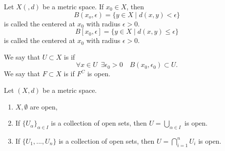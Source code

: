 \documentclass[notoc,notitlepage]{tufte-book}
\begin{document}
\begin{defn}
\label{defn:open_n_closed}
  Let $X(, d)$ be a metric space. If $x_0 \in X$, then
  \begin{equation*}
    B(x_o, \epsilon) = \{ y \in X \mid d(x, y) < \epsilon \}
  \end{equation*}
  is called the  centered at $x_0$ with radius $\epsilon > 0$.
  \begin{equation*}
    B[x_0, \epsilon] = \{ y \in X \mid d(x, y) \leq \epsilon \}
  \end{equation*}
  is called the  centered at $x_0$ with radius $\epsilon > 0$.

  We say that $U \subset X$ is  if
  \begin{equation*}
    \forall x \in U \enspace \exists \epsilon_0 > 0 \quad B(x_0, \epsilon_0) \subset U.
  \end{equation*}
  We say that $F \subset X$ is  if $F^C$ is open.
\end{defn}

\begin{propo}
\label{propo:properties_of_open_sets}
  Let $(X, d)$ be a metric space.
  \begin{enumerate}
    \item $X, \emptyset$ are open,
    \item If $\{ U_\alpha \}_{ \alpha \in I }$ is a collection of open sets, then $U = \bigcup_{\alpha \in I}$ is open.
    \item If $\{ U_1, ..., U_n \}$ is a collection of open sets, then $U = \bigcap_{i = 1}^{n} U_i$ is open.
  \end{enumerate}
\end{propo}
\end{document}
